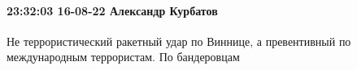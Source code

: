  
 
 
 
 

\paragraph{23:32:03 16-08-22 Александр Курбатов}

Не террористический ракетный удар по Виннице, а превентивный по международным
террористам. По бандеровцам
